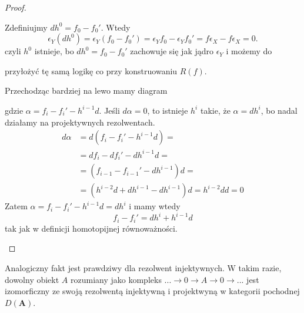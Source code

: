 \begin{proof}
\begin{enumerate}[label=(\alph*)]
    Zdefiniujmy $dh^0=f_0-f_0'$. Wtedy
    $$\epsilon_Y(dh^0)=\epsilon_Y(f_0-f_0')=\epsilon_Yf_0-\epsilon_Yf_0'=f\epsilon_X-f\epsilon_X=0.$$
    czyli $h^0$ istnieje, bo $dh^0=f_0-f_0'$ zachowuje się jak jądro $\epsilon_Y$ i możemy do 
    \begin{center}\end{center}
    przyłożyć tę samą logikę co przy konstruowaniu $R(f)$.

    Przechodząc bardziej na lewo mamy diagram
    \begin{center}\end{center}
    gdzie $\alpha=f_i-f_i'-h^{i-1}d$. Jeśli $d\alpha=0$, to istnieje $h^i$ takie, że $\alpha=d h^i$, bo nadal działamy na projektywnych rezolwentach.
    \begin{align*}
      d\alpha&=d(f_i-f_i'-h^{i-1}d)=\\ 
             &=df_i-df_i'-dh^{i-1}d=\\ 
             &=(f_{i-1}-f_{i-1}'-dh^{i-1})d=\\ 
             &=(h^{i-2}d+dh^{i-1}-dh^{i-1})d=h^{i-2}dd=0
    \end{align*}
    Zatem $\alpha=f_i-f_i'-h^{i-1}d=dh^i$ i mamy wtedy
    $$f_i-f_i'=dh^i+h^{i-1}d$$
    tak jak w definicji homotopijnej równoważności.
\end{enumerate}
\end{proof}

Analogiczny fakt jest prawdziwy dla rezolwent injektywnych. W takim razie, dowolny obiekt $A$ rozumiany jako kompleks $...\to 0\to A\to 0\to...$ jest izomorficzny ze swoją rezolwentą injektywną i projektwyną w kategorii pochodnej $D(\mathbf{A})$.


